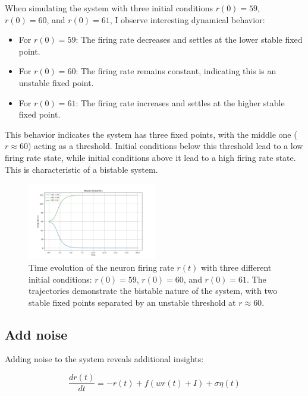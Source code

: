 \documentclass{article}
\begin{document}
When simulating the system with three initial conditions $r(0) = 59$, $r(0) = 60$, and $r(0) = 61$, I observe interesting dynamical behavior:

\begin{itemize}
    \item For $r(0) = 59$: The firing rate decreases and settles at the lower stable fixed point.
    \item For $r(0) = 60$: The firing rate remains constant, indicating this is an unstable fixed point.
    \item For $r(0) = 61$: The firing rate increases and settles at the higher stable fixed point.
\end{itemize}

This behavior indicates the system has three fixed points, with the middle one ($r \approx 60$) acting as a threshold. Initial conditions below this threshold lead to a low firing rate state, while initial conditions above it lead to a high firing rate state. This is characteristic of a bistable system.

\begin{figure}[H]
    \centering
    \includegraphics[width=0.5\textwidth]{deterministic_dynamics.png}
    \caption{Time evolution of the neuron firing rate $r(t)$ with three different initial conditions: $r(0) = 59$, $r(0) = 60$, and $r(0) = 61$. The trajectories demonstrate the bistable nature of the system, with two stable fixed points separated by an unstable threshold at $r \approx 60$.}
    \label{fig:deterministic}
\end{figure}

\subsection{Add noise}

Adding noise to the system reveals additional insights:

\begin{equation}
\frac{dr(t)}{dt} = -r(t) + f(wr(t) + I) + \sigma\eta(t)
\end{equation}
\end{document}
